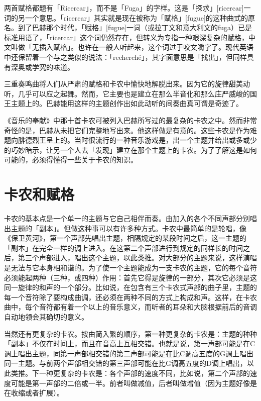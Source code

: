 \documentclass[
  12pt,
  twoside,
  openright,
  oldfontcommands,
]{memoir}
\begin{document}
两首赋格都题有「Ricercar」，而不是「Fuga」的字样。这是「探求」{[}ricercar{]}一词的另一个意思。「ricercar」其实就是现在被称为「赋格」{[}fugue{]}的这种曲式的原名。到了巴赫那个时代，「赋格」{[}fugue{]}一词（或拉丁文和意大利文的fuga）已是标准用语了，「ricercar」这个词仍然存在，但转义为专指一种艰深复杂的赋格，中文叫做「无插入赋格」。也许在一般人听起来，这个词过于咬文嚼字了。现代英语中还保留着一个与之类似的说法：「{recherché}」，其字面意思是「找出」，但同样具有深奥或学究的味道。

三重奏鸣曲将人们从严肃的赋格和卡农中愉快地解脱出来。因为它的旋律甜美动听，几乎可以应之起舞。然而，它主要也是建立在那么半音化和那么庄严威峻的国王主题上的。巴赫能用这样的主题创作出如此动听的间奏曲真可谓是奇迹了。

《音乐的奉献》中那十首卡农可被列入巴赫所写过的最复杂的卡农之中。然而非常奇怪的是，巴赫从未把它们完整地写出来。他这样做是有意的。这些卡农是作为难题向腓德烈王呈上的。当时很流行的一种音乐游戏是，出一个主题并给出或多或少的巧妙暗示，让另一个人去「发现」建立在那个主题上的卡农。为了了解这是如何可能的，必须得懂得一些关于卡农的知识。

\section{卡农和赋格}

卡农的基本点是一个单一的主题与它自己相伴而奏。由加入的各个不同声部分别唱出主题的「副本」。但做这种事可以有许多种方式。卡农中最简单的是轮唱，像《保卫黄河》，第一个声部先唱出主题，相隔规定的某段时间之后，这一主题的「副本」在完全一样的调上进入。在这第二个声部进行到规定的同样长的时间之后，第三个声部进入，唱出这个主题，以此类推。对大部分的主题来说，这样演唱是无法与它本身相和谐的。为了使一个主题能成为一支卡农的主题，它的每个音符必须能起两种（三种，或四种）作用：首先它得是旋律的一部分，其次它必须是这同一旋律的和声的一个部分。比如说，在包含有三个卡农式声部的曲子里，主题的每一个音符除了要构成曲调，还必须在两种不同的方式上构成和声。这样，在卡农曲中，每个音符都有着一个以上的音乐意义，而听者的耳朵和大脑根据前后的音调自动地领会其确切的意义。

当然还有更复杂的卡农。按由简入繁的顺序，第一种更复杂的卡农是：主题的种种「副本」不仅在时间上，而且在音高上互相交错。也就是说，第一声部可能是在C调上唱出主题，同第一声部相交错的第二声部可能是在比C调高五度的G调上唱出同一主题。与前两个声部相交错的第三声部可能在比G调高五度的D调上唱出，以此类推。下一种更复杂的卡农是：各个声部的速度不同，比如说，第二个声部的速度可能是第一声部的二倍或一半。前者叫做减值，后者叫做增值（因为主题好像是在收缩或者扩展）。
\end{document}
